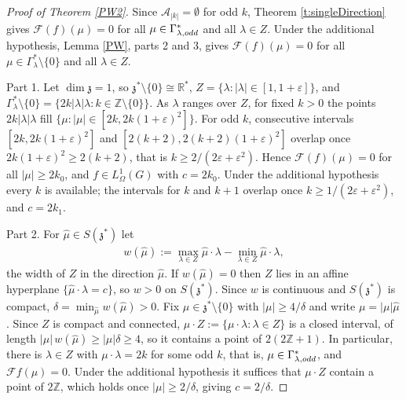 \documentclass[11pt]{amsart}
\theoremstyle{plain}
\theoremstyle{definition}
\theoremstyle{remark}
\numberwithin{equation}{section}
\def\fz{\mathfrak{z}}
\def\cA{\mathcal{A}}
\def\cF{\mathcal{F}}
\def\mz{\setminus\{0\}}
\def\eps{\varepsilon}
\def\R{{\mathbb R}}%
\def\Z{{\mathbb Z}}%
\numberwithin{equation}{section}
\begin{document}
\begin{proof}[Proof of Theorem \ref{PW2}]
	Since $\cA_{|k|}=\emptyset$ for odd $k$, Theorem \ref{t:singleDirection} gives $\cF(f)(\mu)=0$ for all $\mu\in \Gamma_{\lambda, \rm odd}^*$ and all $\lambda\in Z$. Under the additional hypothesis, Lemma \ref{PW}, parts 2 and 3, gives $\cF(f)(\mu)=0$ for all $\mu\in \Gamma_\lambda^*\mz$ and all $\lambda\in Z$.

	Part 1. Let $\dim\fz=1$, so $\fz^*\mz\cong\R^*$, $Z=\{\lambda: |\lambda|\in[1, 1+\eps]\}$, and $\Gamma_\lambda^*\mz=\{2k|\lambda|\lambda: k\in \Z\mz\}$. As $\lambda$ ranges over $Z$, for fixed $k>0$ the points $2k|\lambda|\lambda$ fill $\{\mu: |\mu|\in[2k, 2k(1+\eps)^2]\}$. For odd $k$, consecutive intervals $[2k, 2k(1+\eps)^2]$ and $[2(k+2), 2(k+2)(1+\eps)^2]$ overlap once $2k(1+\eps)^2\geq 2(k+2)$, that is $k\geq 2/(2\eps+\eps^2)$. Hence $\cF(f)(\mu)=0$ for all $|\mu|\geq 2k_0$, and $f\in L^1_\Omega(G)$ with $c=2k_0$. Under the additional hypothesis every $k$ is available; the intervals for $k$ and $k+1$ overlap once $k\geq 1/(2\eps+\eps^2)$, and $c=2k_1$.

	Part 2. For $\hat\mu\in S(\fz^*)$ let
	\begin{align*}
		w(\hat\mu):=\max_{\lambda\in Z}\hat\mu\cdot\lambda-\min_{\lambda\in Z}\hat\mu\cdot\lambda,
	\end{align*}
	the width of $Z$ in the direction $\hat\mu$. If $w(\hat\mu)=0$ then $Z$ lies in an affine hyperplane $\{\hat\mu\cdot\lambda=c\}$, so $w>0$ on $S(\fz^*)$. Since $w$ is continuous and $S(\fz^*)$ is compact, $\delta=\min_{\hat\mu}w(\hat\mu)>0$. Fix $\mu\in \fz^*\mz$ with $|\mu|\geq 4/\delta$ and write $\mu=|\mu|\hat\mu$. Since $Z$ is compact and connected, $\mu\cdot Z:=\{\mu\cdot\lambda: \lambda\in Z\}$ is a closed interval, of length $|\mu|\,w(\hat\mu)\geq |\mu|\delta\geq 4$, so it contains a point of $2(2\Z+1)$. In particular, there is $\lambda\in Z$ with $\mu\cdot\lambda=2k$ for some odd $k$, that is, $\mu\in \Gamma_{\lambda, \rm odd}^*$, and $\cF f(\mu)=0$. Under the additional hypothesis it suffices that $\mu\cdot Z$ contain a point of $2\Z$, which holds once $|\mu|\geq 2/\delta$, giving $c=2/\delta$.


\end{proof}
\end{document}
